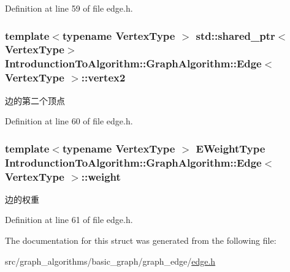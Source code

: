 Definition at line 59 of file edge.\+h.

\hypertarget{struct_introdunction_to_algorithm_1_1_graph_algorithm_1_1_edge_a8f472842aacb0079c66bc7b98fbc6351}{}
\subsubsection[{vertex2}]{\setlength{\rightskip}{0pt plus 5cm}template$<$typename Vertex\+Type $>$ std\+::shared\+\_\+ptr$<$Vertex\+Type$>$ {\bf Introdunction\+To\+Algorithm\+::\+Graph\+Algorithm\+::\+Edge}$<$ Vertex\+Type $>$\+::vertex2}\label{struct_introdunction_to_algorithm_1_1_graph_algorithm_1_1_edge_a8f472842aacb0079c66bc7b98fbc6351}
边的第二个顶点 

Definition at line 60 of file edge.\+h.

\hypertarget{struct_introdunction_to_algorithm_1_1_graph_algorithm_1_1_edge_a0ce18b9faeda82aabc5293e5ceb3924f}{}
\subsubsection[{weight}]{\setlength{\rightskip}{0pt plus 5cm}template$<$typename Vertex\+Type $>$ {\bf E\+Weight\+Type} {\bf Introdunction\+To\+Algorithm\+::\+Graph\+Algorithm\+::\+Edge}$<$ Vertex\+Type $>$\+::weight}\label{struct_introdunction_to_algorithm_1_1_graph_algorithm_1_1_edge_a0ce18b9faeda82aabc5293e5ceb3924f}
边的权重 

Definition at line 61 of file edge.\+h.



The documentation for this struct was generated from the following file\+:\begin{DoxyCompactItemize}
\item 
src/graph\+\_\+algorithms/basic\+\_\+graph/graph\+\_\+edge/\hyperlink{edge_8h}{edge.\+h}\end{DoxyCompactItemize}
